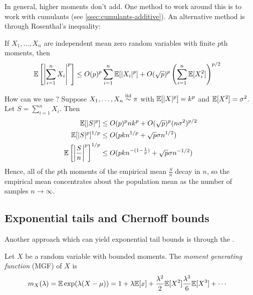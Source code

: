 In general, higher moments don't add.
One method to work around this is to work with cumulants (see \cref{ssec:cumulants-additive}).
An alternative method is through Rosenthal's inequality:

\begin{lemma}\label{lem:rosenthal-ineq}
    If $X_1,\ldots, X_n$ are independent mean zero random variables with finite $p$th moments, then
    \begin{align}
        \mathbb{E}\left[\left\lvert \sum_{i=1}^n X_i \right\rvert^p\right]
        &\leq O(p)^p \sum_{i=1}^n \mathbb{E}[\lvert X_i \rvert^p]
        + O(\sqrt{p})^p \left( \sum_{i=1}^n \mathbb{E}[X_i^2] \right)^{p/2}
    \end{align}
\end{lemma}

How can we use ?
Suppose $X_1, \ldots, X_n \overset{\text{iid}}{\sim} \pi$ with $\mathbb{E}[\lvert X \rvert^p] = k^p$
and $\mathbb{E}[X^2] = \sigma^2$. Let $S = \sum_{i=1}^n X_i$.
Then
\begin{align}
    \mathbb{E}[\lvert S \rvert^p ] &\leq O(p)^p n k^p + O(\sqrt{p})^p (n \sigma^2)^{p/2} \\
    \mathbb{E}[\lvert S \rvert^p]^{1/p} &\leq O(p k n^{1/p} + \sqrt{p} \sigma n^{1/2}) \\
    \mathbb{E}\left[ \left\lvert \frac{S}{n} \right\rvert^p \right]^{1/p}
    &\leq O(p k n^{-(1-\frac{1}{p})} + \sqrt{p} \sigma n^{-1/2})
\end{align}
Hence, all of the $p$th moments of the empirical mean $\frac{S}{n}$ decay in $n$,
so the empirical mean concentrates about the population mean as the number of samples $n \to \infty$.

\subsection{Exponential tails and Chernoff bounds}

Another approach which can yield exponential tail bounds is through the . 
\begin{definition}\label{def:moment-generating-function}
    Let $X$ be a random variable with bounded moments.
    The \emph{moment generating function} (MGF) of $X$ is
    \begin{align}
        m_X(\lambda)
        &= \mathbb{E} \exp(\lambda (X - \mu))
        = 1 + \lambda \mathbb{E}[x] + \frac{\lambda^2}{2} \mathbb{E}[X^2]  \frac{\lambda^3}{6} \mathbb{E}[X^3] + \cdots
    \end{align}
\end{definition}

